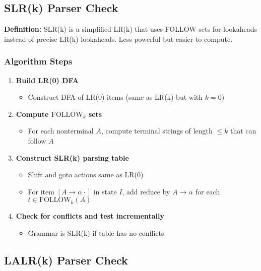 \subsection{SLR(k) Parser Check}

\textbf{Definition:} SLR(k) is a simplified LR(k) that uses FOLLOW sets for lookaheads instead of precise LR(k) lookaheads. Less powerful but easier to compute.

\subsubsection{Algorithm Steps}

\begin{enumerate}
    \item \textbf{Build LR(0) DFA}
    \begin{itemize}
        \item Construct DFA of LR(0) items (same as LR(k) but with $k = 0$)
    \end{itemize}

    \item \textbf{Compute $\text{FOLLOW}_k$ sets}
    \begin{itemize}
        \item For each nonterminal $A$, compute terminal strings of length $\leq k$ that can follow $A$
    \end{itemize}

    \item \textbf{Construct SLR(k) parsing table}
    \begin{itemize}
        \item Shift and goto actions same as LR(0)
        \item For item $[A \to \alpha \cdot]$ in state $I$, add reduce by $A \to \alpha$ for each $t \in \text{FOLLOW}_k(A)$
    \end{itemize}

    \item \textbf{Check for conflicts and test incrementally}
    \begin{itemize}
        \item Grammar is SLR(k) if table has no conflicts
    \end{itemize}
\end{enumerate}

\subsection{LALR(k) Parser Check}

